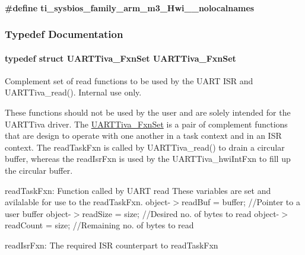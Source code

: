 \paragraph[{ti\+\_\+sysbios\+\_\+family\+\_\+arm\+\_\+m3\+\_\+\+Hwi\+\_\+\+\_\+nolocalnames}]{\setlength{\rightskip}{0pt plus 5cm}\#define ti\+\_\+sysbios\+\_\+family\+\_\+arm\+\_\+m3\+\_\+\+Hwi\+\_\+\+\_\+nolocalnames}\label{_u_a_r_t_tiva_8h_aaa17ecf48f5762e2e1bdb0bab8aacf0c}


\subsubsection{Typedef Documentation}
\paragraph[{U\+A\+R\+T\+Tiva\+\_\+\+Fxn\+Set}]{\setlength{\rightskip}{0pt plus 5cm}typedef struct {\bf U\+A\+R\+T\+Tiva\+\_\+\+Fxn\+Set}  {\bf U\+A\+R\+T\+Tiva\+\_\+\+Fxn\+Set}}\label{_u_a_r_t_tiva_8h_ada02c4e98c5fe4791f8781c6d8b950fb}


Complement set of read functions to be used by the U\+A\+R\+T I\+S\+R and U\+A\+R\+T\+Tiva\+\_\+read(). Internal use only. 

These functions should not be used by the user and are solely intended for the U\+A\+R\+T\+Tiva driver. The \hyperlink{struct_u_a_r_t_tiva___fxn_set}{U\+A\+R\+T\+Tiva\+\_\+\+Fxn\+Set} is a pair of complement functions that are design to operate with one another in a task context and in an I\+S\+R context. The read\+Task\+Fxn is called by U\+A\+R\+T\+Tiva\+\_\+read() to drain a circular buffer, whereas the read\+Isr\+Fxn is used by the U\+A\+R\+T\+Tiva\+\_\+hwi\+Int\+Fxn to fill up the circular buffer.

read\+Task\+Fxn\+: Function called by U\+A\+R\+T read These variables are set and avilalable for use to the read\+Task\+Fxn. object-\/$>$read\+Buf = buffer; //\+Pointer to a user buffer object-\/$>$read\+Size = size; //\+Desired no. of bytes to read object-\/$>$read\+Count = size; //\+Remaining no. of bytes to read

read\+Isr\+Fxn\+: The required I\+S\+R counterpart to read\+Task\+Fxn 
